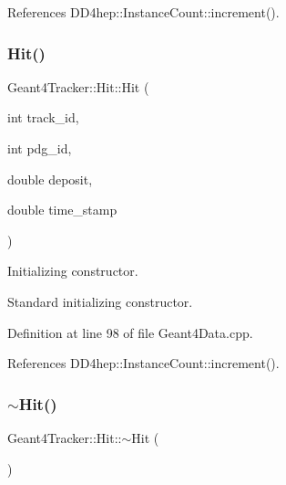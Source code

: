 References D\+D4hep\+::\+Instance\+Count\+::increment().

\hypertarget{class_d_d4hep_1_1_simulation_1_1_geant4_tracker_1_1_hit_a2f02d476b53ca077e7bb1326e99a4267}{}\label{class_d_d4hep_1_1_simulation_1_1_geant4_tracker_1_1_hit_a2f02d476b53ca077e7bb1326e99a4267} 
\subsubsection{\texorpdfstring{Hit()}{Hit()}\hspace{0.1cm}{\footnotesize\ttfamily [2/2]}}
{\footnotesize\ttfamily Geant4\+Tracker\+::\+Hit\+::\+Hit (\begin{DoxyParamCaption}\item[{int}]{track\+\_\+id,  }\item[{int}]{pdg\+\_\+id,  }\item[{double}]{deposit,  }\item[{double}]{time\+\_\+stamp }\end{DoxyParamCaption})}



Initializing constructor. 

Standard initializing constructor. 

Definition at line 98 of file Geant4\+Data.\+cpp.



References D\+D4hep\+::\+Instance\+Count\+::increment().

\hypertarget{class_d_d4hep_1_1_simulation_1_1_geant4_tracker_1_1_hit_ad443787a7dd9e83a0b93248f823b375d}{}\label{class_d_d4hep_1_1_simulation_1_1_geant4_tracker_1_1_hit_ad443787a7dd9e83a0b93248f823b375d} 
\subsubsection{\texorpdfstring{$\sim$\+Hit()}{~Hit()}}
{\footnotesize\ttfamily Geant4\+Tracker\+::\+Hit\+::$\sim$\+Hit (\begin{DoxyParamCaption}{ }\end{DoxyParamCaption})\hspace{0.3cm}{\ttfamily [virtual]}}



